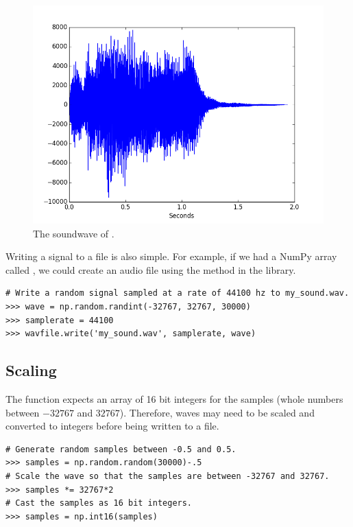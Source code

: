 \begin{figure}[ht]\centering\includegraphics[width=\textwidth]{tada.png}\caption{The soundwave of .}\label{fig:tada_sig}\end{figure}

Writing a signal to a file is also simple.
For example, if we had a NumPy array called , we could create an audio file using the  method in the  library.

\begin{lstlisting}
# Write a random signal sampled at a rate of 44100 hz to my_sound.wav.
>>> wave = np.random.randint(-32767, 32767, 30000)
>>> samplerate = 44100
>>> wavfile.write('my_sound.wav', samplerate, wave)
\end{lstlisting}

\subsection*{Scaling}

The  function expects an array of 16 bit integers for the samples (whole numbers between $-32767$ and $32767$).
Therefore, waves may need to be scaled and converted to integers before being written to a file.

\begin{lstlisting}
# Generate random samples between -0.5 and 0.5.
>>> samples = np.random.random(30000)-.5
# Scale the wave so that the samples are between -32767 and 32767.
>>> samples *= 32767*2
# Cast the samples as 16 bit integers.
>>> samples = np.int16(samples)
\end{lstlisting}

